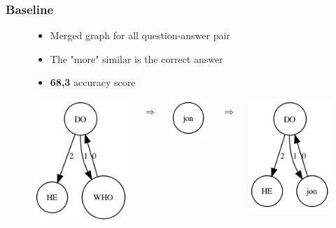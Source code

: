 \documentclass[bigger]{beamer}
\begin{document}
\begin{frame}
    \frametitle{Baseline}
    \begin{figure}
        \centering
        \small
            \begin{itemize}
				\item Merged graph for all question-answer pair
				\item The "more" similar is the correct answer
				\item \textbf{68,3} accuracy score
			\end{itemize}
            \begin{columns}
				\begin{column}{0.2\textwidth}
					\pause \includegraphics[scale=0.5]{pics/didit.png}
				\end{column}
				\begin{column}{0.2\textwidth}
				\pause \[\Rightarrow\]
				\end{column}
				\begin{column}{0.2\textwidth}
					\pause \includegraphics[scale=0.5]{pics/jon.png}
				\end{column}
				\begin{column}{0.2\textwidth}
					\pause \[\Rightarrow\]
				\end{column}
				\begin{column}{0.3\textwidth}
				\pause \includegraphics[scale=0.5]{pics/jondid.png}
				\end{column}
			\end{columns}
        \label{fig:method}
        \end{figure}
\end{frame}
\end{document}
